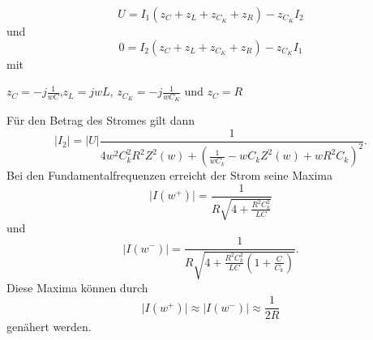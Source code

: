 \begin{equation}
    U = I_1 (z_C + z_L + z_{C_K} + z_R) - z_{C_K} I_2
    \label{eqn:Fuenfzehn}
\end{equation}
und
\begin{equation}
    0 = I_2 (z_C + z_L + z_{C_K} + z_R) - z_{C_K} I_1
    \label{eqn:Sechzehn}
\end{equation}
mit
\begin{center}
    $z_C = -j \frac{1}{wC}$,$z_L = jwL$, $z_{C_K} = -j \frac{1}{wC_K}$  und  $z_C = R$
\end{center}
Für den Betrag des Stromes gilt dann
\begin{equation}
    \lvert I_2\rvert = \lvert U\rvert \frac{1}{ 4w^2C_k^2R^2Z^2(w) + ( \frac{1}{wC_k} - wC_kZ^2(w) + wR^2C_k )^2 }.
    \label{eqn:Zwanzig}
\end{equation}
Bei den Fundamentalfrequenzen erreicht der Strom seine Maxima
\begin{equation}
    \lvert I(w^{+})\rvert = \frac{1}{ R\sqrt{4 + \frac{R^2C_k^2}{LC}}}
    \label{eqn:Einundzwandzig}
\end{equation}
und
\begin{equation}
    \lvert I(w^{-})\rvert = \frac{1}{ R\sqrt{4 + \frac{R^2C_k^2}{LC}(1+\frac{C}{C_k})}}.
    \label{eqn:Zweiundzwandzig}
\end{equation}
Diese Maxima können durch 
\begin{equation}
    \lvert I(w^{+})\rvert \approx \lvert I(w^{-})\rvert \approx \frac{1}{2R}
    \label{eqn:Dreiundzwandzig}
\end{equation}
genähert werden.


